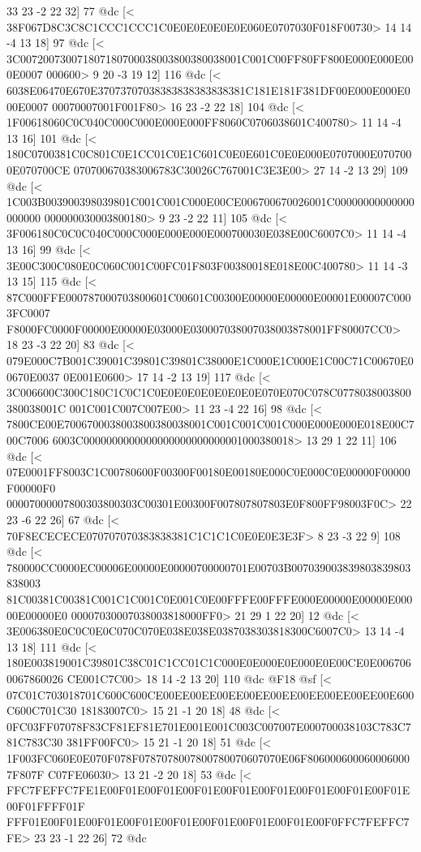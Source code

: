 	 33 23 -2 22 32] 77 @dc
[<
38F067D8C3C8C1CCC1CCC1C0E0E0E0E0E0E060E0707030F018F00730>
	 14 14 -4 13 18] 97 @dc
[<
3C007200730071807180700038003800380038001C001C00FF80FF800E000E000E000E0007
000600>
	 9 20 -3 19 12] 116 @dc
[<
6038E06470E670E37073707038383838383838381C181E181F381DF00E000E000E000E0007
00070007001F001F80>
	 16 23 -2 22 18] 104 @dc
[<
1F00618060C0C040C000C000E000E000FF8060C0706038601C400780>
	 11 14 -4 13 16] 101 @dc
[<
180C0700381C0C801C0E1CC01C0E1C601C0E0E601C0E0E000E0707000E0707000E070700CE
070700670383006783C30026C767001C3E3E00>
	 27 14 -2 13 29] 109 @dc
[<
1C003B003900398039801C001C001C000E00CE006700670026001C00000000000000000000
000000030003800180>
	 9 23 -2 22 11] 105 @dc
[<
3F006180C0C0C040C000C000E000E000E000700030E038E00C6007C0>
	 11 14 -4 13 16] 99 @dc
[<
3E00C300C080E0C060C001C00FC01F803F00380018E018E00C400780>
	 11 14 -3 13 15] 115 @dc
[<
87C000FFE000787000703800601C00601C00300E00000E00000E00001E00007C0003FC0007
F8000FC0000F00000E00000E03000E030007038007038003878001FF80007CC0>
	 18 23 -3 22 20] 83 @dc
[<
079E000C7B001C39001C39801C39801C38000E1C000E1C000E1C00C71C00670E00670E0037
0E001E0600>
	 17 14 -2 13 19] 117 @dc
[<
3C006600C300C180C1C0C1C0E0E0E0E0E0E0E0E070E070C078C0778038003800380038001C
001C001C007C007E00>
	 11 23 -4 22 16] 98 @dc
[<
7800CE00E7006700038003800380038001C001C001C001C000E000E000E018E00C700C7006
6003C0000000000000000000000000001000380018>
	 13 29 1 22 11] 106 @dc
[<
07E0001FF8003C1C00780600F00300F00180E00180E000C0E000C0E00000F00000F00000F0
00007000007800303800303C00301E00300F007807807803E0F800FF98003F0C>
	 22 23 -6 22 26] 67 @dc
[<
70F8ECECECE070707070383838381C1C1C1C0E0E0E3E3F>
	 8 23 -3 22 9] 108 @dc
[<
780000CC0000EC00006E00000E00000700000701E00703B007039003839803839803838003
81C00381C00381C001C1C001C0E001C0E00FFFE00FFFE000E00000E00000E00000E00000E0
00007030007038003818000FF0>
	 21 29 1 22 20] 12 @dc
[<
3E006380E0C0C0E0C070C070E038E038E0387038303818300C6007C0>
	 13 14 -4 13 18] 111 @dc
[<
180E003819001C39801C38C01C1CC01C1C000E0E000E0E000E0E00CE0E0067060067860026
CE001C7C00>
	 18 14 -2 13 20] 110 @dc
@F18 @sf
[<
07C01C703018701C600C600CE00EE00EE00EE00EE00EE00EE00EE00EE00E600C600C701C30
18183007C0>
	 15 21 -1 20 18] 48 @dc
[<
0FC03FF07078F83CF81EF81E701E001E001C003C007007E000700038103C783C781C783C30
381FF00FC0>
	 15 21 -1 20 18] 51 @dc
[<
1F003FC060E0E070F078F0787078007800780070607070E06F8060006000600060007F807F
C07FE06030>
	 13 21 -2 20 18] 53 @dc
[<
FFC7FEFFC7FE1E00F01E00F01E00F01E00F01E00F01E00F01E00F01E00F01E00F01FFFF01F
FFF01E00F01E00F01E00F01E00F01E00F01E00F01E00F01E00F0FFC7FEFFC7FE>
	 23 23 -1 22 26] 72 @dc
